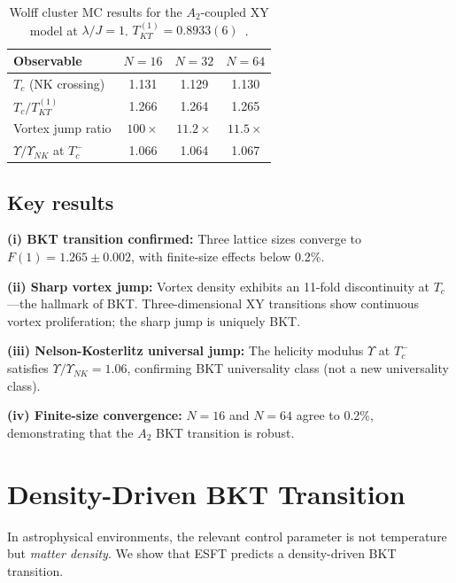 ﻿\documentclass[twocolumn,showpacs,preprintnumbers,amsmath,amssymb,prd]{revtex4-2}
\begin{document}
\begin{table}[h]
\caption{Wolff cluster MC results for the $A_2$-coupled XY model at $\lambda/J = 1$. $T_{KT}^{(1)} = 0.8933(6)$~\cite{Kosterlitz1973}.}
\label{tab:wolff}
\begin{ruledtabular}
\begin{tabular}{lccc}
Observable & $N=16$ & $N=32$ & $N=64$ \\
\hline
$T_c$ (NK crossing) & 1.131 & 1.129 & 1.130 \\
$T_c / T_{KT}^{(1)}$ & 1.266 & 1.264 & 1.265 \\
Vortex jump ratio & $100\times$ & $11.2\times$ & $11.5\times$ \\
$\Upsilon / \Upsilon_{NK}$ at $T_c^-$ & 1.066 & 1.064 & 1.067 \\
\end{tabular}
\end{ruledtabular}
\end{table}

\subsection{Key results}

\textbf{(i) BKT transition confirmed:} Three lattice sizes converge to $F(1) = 1.265 \pm 0.002$, with finite-size effects below 0.2\%.

\textbf{(ii) Sharp vortex jump:} Vortex density exhibits an 11-fold discontinuity at $T_c$---the hallmark of BKT. Three-dimensional XY transitions show continuous vortex proliferation; the sharp jump is uniquely BKT.

\textbf{(iii) Nelson-Kosterlitz universal jump:} The helicity modulus $\Upsilon$ at $T_c^-$ satisfies $\Upsilon/\Upsilon_{NK} = 1.06$, confirming BKT universality class (not a new universality class).

\textbf{(iv) Finite-size convergence:} $N=16$ and $N=64$ agree to 0.2\%, demonstrating that the $A_2$ BKT transition is robust.

\section{Density-Driven BKT Transition}
\label{sec:density}

In astrophysical environments, the relevant control parameter is not temperature but \emph{matter density}. We show that ESFT predicts a density-driven BKT transition.
\end{document}
